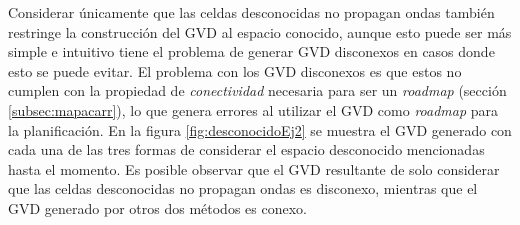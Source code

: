 
Considerar únicamente que las celdas desconocidas no propagan ondas también
restringe la construcción del GVD al espacio conocido, aunque esto puede ser
más simple e intuitivo tiene el problema de generar GVD disconexos en casos
donde esto se puede evitar. El problema con los GVD disconexos es que estos no
cumplen con la propiedad de \emph{conectividad} necesaria para ser un
\emph{roadmap} (sección \ref{subsec:mapacarr}), lo que genera errores al
utilizar el GVD como \emph{roadmap} para la planificación. En la figura
\ref{fig:desconocidoEj2} se muestra el GVD generado con cada una de las tres
formas de considerar el espacio desconocido mencionadas hasta el momento. Es
posible observar que el GVD resultante de solo considerar que las celdas
desconocidas no propagan ondas es disconexo, mientras que el GVD generado por
otros dos métodos es conexo.



